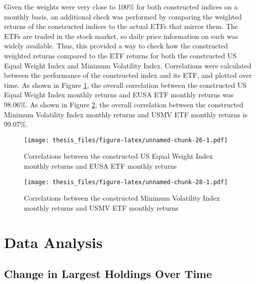 \documentclass[12pt,twoside]{reedthesis}
\theoremstyle{definition}
\theoremstyle{definition}
\theoremstyle{definition}
\theoremstyle{remark}
\begin{document}
Given the weights were very close to 100\% for both constructed indices
on a monthly basis, an additional check was performed by comparing the
weighted returns of the constructed indices to the actual ETFs that
mirror them. The ETFs are traded in the stock market, so daily price
information on each was widely available. Thus, this provided a way to
check how the constructed weighted returns compared to the ETF returns
for both the constructed US Equal Weight Index and Minimum Volatility
Index. Correlations were calculated between the performance of the
constructed index and its ETF, and plotted over time. As shown in Figure
\ref{fig:plot3}, the overall correlation between the constructed US
Equal Weight Index monthly returns and EUSA ETF monthly returns was
98.06\%. As shown in Figure \ref{fig:plot4}, the overall correlation
between the constructed Minimum Volatility Index monthly returns and
USMV ETF monthly returns is 99.07\%.
\begin{figure}[htbp]
\centering
\texttt{[image: thesis\_files/figure-latex/unnamed-chunk-26-1.pdf]}
\caption{\label{fig:unnamed-chunk-26}Correlations between the constructed US
Equal Weight Index monthly returns and EUSA ETF monthly
returns\label{fig:plot3}}
\end{figure}
\begin{figure}[htbp]
\centering
\texttt{[image: thesis\_files/figure-latex/unnamed-chunk-28-1.pdf]}
\caption{\label{fig:unnamed-chunk-28}Correlations between the constructed
Minimum Volatility Index monthly returns and USMV ETF monthly
returns\label{fig:plot4}}
\end{figure}
\chapter{Data Analysis}\label{data-analysis}

\section{Change in Largest Holdings Over
Time}\label{change-in-largest-holdings-over-time}
\end{document}
